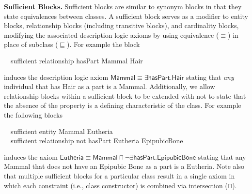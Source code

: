 \documentclass[5p,authoryear]{elsarticle}
\newcommand{\myblock}[1]{\vspace{12pt}\noindent\textbf{#1}}
\begin{document}


\myblock{Sufficient Blocks.} Sufficient blocks are similar to synonym
blocks in that they state equivalences between classes. A sufficient
block serves as a modifier to entity blocks, relationship blocks
(including transitive blocks), and cardinality blocks, modifying the
associated description logic axioms by using equivalence ($\equiv$) in
place of subclass ($\sqsubseteq$). For example the block
\begin{tabbing}
  ~~\textsf{sufficient} \textsf{relationship} \textsf{hasPart} \textsf{Mammal} \textsf{Hair} 
\end{tabbing}
induces the description logic axiom $\textsf{Mammal} \equiv \exists
\textsf{hasPart}.\textsf{Hair}$ stating that \emph{any} individual
that has Hair as a part is a Mammal. Additionally, we allow
relationship blocks within a sufficient block to be extended with
\textsf{not} to state that the absence of the property is a defining
characteristic of the class. For example the following blocks
\begin{tabbing}
  ~~\textsf{sufficient} \textsf{entity} \textsf{Mammal} \textsf{Eutheria} \\
  ~~\textsf{sufficient} \textsf{relationship not} \textsf{hasPart} \textsf{Eutheria} \textsf{EpipubicBone} 
\end{tabbing}
induces the axiom $\textsf{Eutheria} \equiv \textsf{Mammal} \sqcap
\neg \exists \textsf{hasPart} . \textsf{EpipubicBone}$ stating that
any Mammal that does not have an Epipubic Bone as a part is a
Eutheria. Note also that multiple sufficient blocks for a particular
class result in a single axiom in which each constraint (i.e., class
constructor) is combined via intersection ($\sqcap$).
\end{document}
